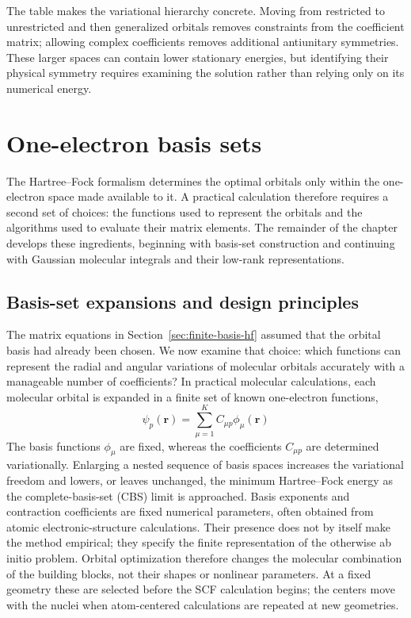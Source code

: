 \documentclass[11pt,a4paper,titlepage]{article}
\numberwithin{equation}{section}
\newcommand{\br}{\boldsymbol{r}}
\begin{document}
The table makes the variational hierarchy concrete. Moving from restricted to
unrestricted and then generalized orbitals removes constraints from the
coefficient matrix; allowing complex coefficients removes additional
antiunitary symmetries. These larger spaces can contain lower stationary
energies, but identifying their physical symmetry requires examining the
solution rather than relying only on its numerical energy.


\clearpage
\section{One-electron basis sets}
\label{sec:basis-sets}

The Hartree--Fock formalism determines the optimal orbitals only within the
one-electron space made available to it. A practical calculation therefore
requires a second set of choices: the functions used to represent the
orbitals and the algorithms used to evaluate their matrix elements. The
remainder of the chapter develops these ingredients, beginning with basis-set
construction and continuing with Gaussian molecular integrals and their
low-rank representations.


\subsection{Basis-set expansions and design principles}

The matrix equations in Section~\ref{sec:finite-basis-hf} assumed that the
orbital basis had already been chosen. We now examine that choice: which
functions can represent the radial and angular variations of molecular
orbitals accurately with a manageable number of coefficients?
In practical molecular calculations, each molecular orbital is expanded in a
finite set of known one-electron functions,
\begin{equation}
  \psi_p(\br)=\sum_{\mu=1}^{K}C_{\mu p}\phi_\mu(\br)
\end{equation}
The basis functions $\phi_\mu$ are fixed, whereas the coefficients $C_{\mu p}$
are determined variationally. Enlarging a nested sequence of basis spaces
increases the variational freedom and lowers, or leaves unchanged, the minimum
Hartree--Fock energy as the complete-basis-set (CBS) limit is approached. Basis exponents
and contraction coefficients are fixed numerical parameters, often obtained
from atomic electronic-structure calculations. Their presence does not by
itself make the method empirical; they specify the finite representation of
the otherwise ab initio problem.
Orbital optimization therefore changes the molecular combination of the
building blocks, not their shapes or nonlinear parameters. At a fixed
geometry these are selected before the SCF calculation begins; the centers
move with the nuclei when atom-centered calculations are repeated at new
geometries.
\end{document}
